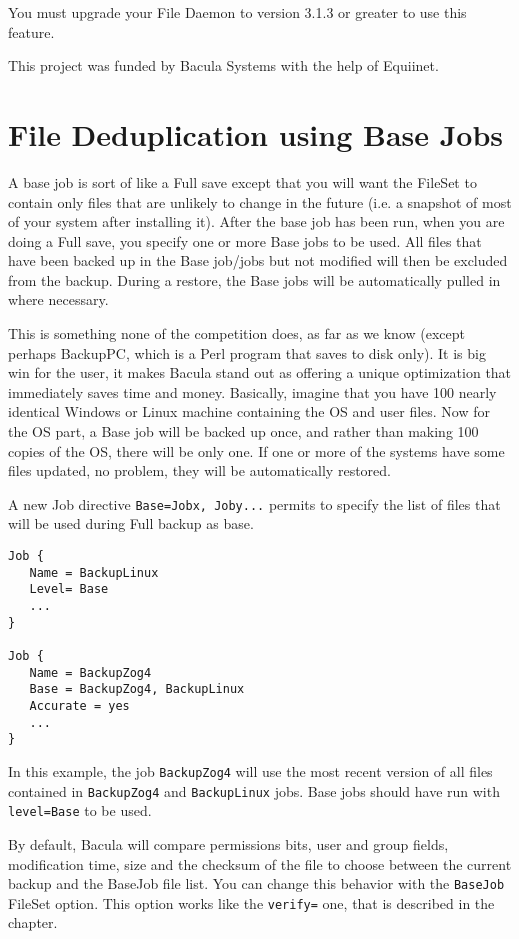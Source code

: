 You must upgrade your File Daemon to version 3.1.3 or greater to use this feature.

This project was funded by Bacula Systems with the help of Equiinet.

\section{File Deduplication using Base Jobs}
A base job is sort of like a Full save except that you will want the FileSet to
contain only files that are unlikely to change in the future (i.e.  a snapshot
of most of your system after installing it).  After the base job has been run,
when you are doing a Full save, you specify one or more Base jobs to be used.
All files that have been backed up in the Base job/jobs but not modified will
then be excluded from the backup.  During a restore, the Base jobs will be
automatically pulled in where necessary.

This is something none of the competition does, as far as we know (except
perhaps BackupPC, which is a Perl program that saves to disk only).  It is big
win for the user, it makes Bacula stand out as offering a unique optimization
that immediately saves time and money.  Basically, imagine that you have 100
nearly identical Windows or Linux machine containing the OS and user files.
Now for the OS part, a Base job will be backed up once, and rather than making
100 copies of the OS, there will be only one.  If one or more of the systems
have some files updated, no problem, they will be automatically restored.

A new Job directive \texttt{Base=Jobx, Joby...} permits to specify the list of
files that will be used during Full backup as base.

\begin{verbatim}
Job {
   Name = BackupLinux
   Level= Base
   ...
}

Job {
   Name = BackupZog4
   Base = BackupZog4, BackupLinux
   Accurate = yes
   ...
}
\end{verbatim}

In this example, the job \texttt{BackupZog4} will use the most recent version
of all files contained in \texttt{BackupZog4} and \texttt{BackupLinux}
jobs. Base jobs should have run with \texttt{level=Base} to be used.

By default, Bacula will compare permissions bits, user and group fields,
modification time, size and the checksum of the file to choose between the
current backup and the BaseJob file list. You can change this behavior with the
\texttt{BaseJob} FileSet option. This option works like the \texttt{verify=}
one, that is described in the  chapter.

